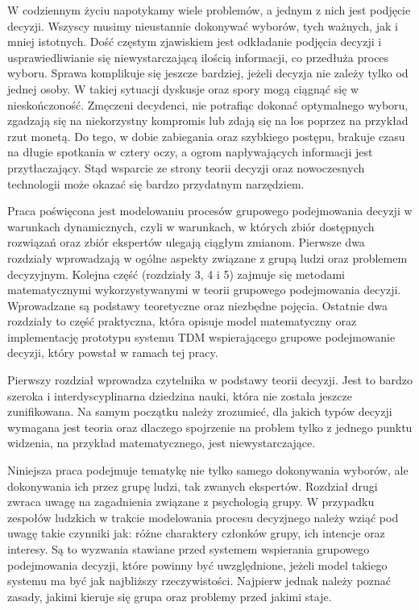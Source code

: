 W codziennym życiu napotykamy wiele problemów, a jednym z nich jest podjęcie
decyzji. Wszyscy musimy nieustannie dokonywać wyborów, tych ważnych, jak i mniej
istotnych. Dość częstym zjawiskiem jest odkładanie podjęcia decyzji i
usprawiedliwianie się niewystarczającą ilością informacji, co przedłuża proces
wyboru. Sprawa komplikuje się jeszcze bardziej, jeżeli decyzja nie zależy tylko
od jednej osoby. W takiej sytuacji dyskusje oraz spory mogą ciągnąć się w
nieskończoność. Zmęczeni decydenci, nie potrafiąc dokonać optymalnego wyboru,
zgadzają się na niekorzystny kompromis lub zdają się na los poprzez na
przykład rzut monetą. Do tego, w dobie zabiegania oraz szybkiego postępu,
brakuje czasu na długie spotkania w cztery oczy, a ogrom napływających
informacji jest przytłaczający. Stąd wsparcie ze strony teorii decyzji oraz
nowoczesnych technologii może okazać się bardzo przydatnym narzędziem.

Praca poświęcona jest modelowaniu procesów grupowego podejmowania decyzji w
warunkach dynamicznych, czyli w warunkach, w których zbiór dostępnych rozwiązań
oraz zbiór ekspertów ulegają ciągłym zmianom. Pierwsze dwa rozdziały wprowadzają
w ogólne aspekty związane z grupą ludzi oraz problemem decyzyjnym. Kolejna część
(rozdziały 3, 4 i 5) zajmuje się metodami matematycznymi wykorzystywanymi w
teorii grupowego podejmowania decyzji. Wprowadzane są podstawy teoretyczne oraz
niezbędne pojęcia. Ostatnie dwa rozdziały to część praktyczna, która opisuje
model matematyczny oraz implementację prototypu systemu TDM wspierającego
grupowe podejmowanie decyzji, który powstał w ramach tej pracy.

Pierwszy rozdział wprowadza czytelnika w podstawy teorii decyzji. Jest to bardzo
szeroka i interdyscyplinarna dziedzina nauki, która nie została jeszcze
zunifikowana. Na samym początku należy zrozumieć, dla jakich typów decyzji
wymagana jest teoria oraz dlaczego spojrzenie na problem tylko z jednego punktu
widzenia, na przykład matematycznego, jest niewystarczające.

Niniejsza praca podejmuje tematykę nie tylko samego dokonywania wyborów, ale
dokonywania ich przez grupę ludzi, tak zwanych ekspertów. Rozdział drugi zwraca
uwagę na zagadnienia związane z psychologią grupy. W przypadku zespołów
ludzkich w trakcie modelowania procesu decyzjnego należy wziąć pod uwagę takie
czynniki jak: różne charaktery członków grupy, ich intencje oraz interesy. Są to
wyzwania stawiane przed systemem wspierania grupowego podejmowania decyzji,
które powinny być uwzględnione, jeżeli model takiego systemu ma być jak
najbliższy rzeczywistości. Najpierw jednak należy poznać zasady, jakimi kieruje
się grupa oraz problemy przed jakimi staje.

